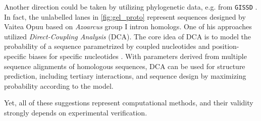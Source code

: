 \documentclass[../../master.tex]{subfiles}
\begin{document}
Another direction could be taken by utilizing phylogenetic data, e.g. from \texttt{GISSD} \parencite{zhou_gissd_2008}.
In fact, the unlabelled lanes in \autoref{fig:gel_proto} represent sequences designed by Vaitea Opuu based on \textit{Azoarcus} group I intron homologs.
One of his approaches utilized \emph{Direct-Coupling Analysis} (DCA).
The core idea of DCA is to model the probability of a sequence parametrized by coupled nucleotides and position-specific biases for specific nucleotides \parencite{de_leonardis_direct-coupling_2015}.
With parameters derived from multiple sequence alignments of homologous sequences, DCA can be used for structure prediction, including tertiary interactions, and sequence design by maximizing probability according to the model.





Yet, all of these suggestions represent computational methods, and their validity strongly depends on experimental verification.
\end{document}
